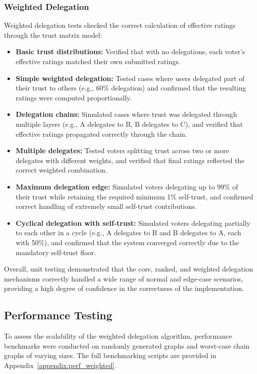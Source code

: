 \subsubsection{Weighted Delegation}
Weighted delegation tests checked the correct calculation of effective ratings through the trust matrix model:
\begin{itemize}
    \item \textbf{Basic trust distributions:} Verified that with no delegations, each voter's effective ratings matched their own submitted ratings.

    \item \textbf{Simple weighted delegation:} Tested cases where users delegated part of their trust to others (e.g., 60\% delegation) and confirmed that the resulting ratings were computed proportionally.

    \item \textbf{Delegation chains:} Simulated cases where trust was delegated through multiple layers (e.g., A delegates to B, B delegates to C), and verified that effective ratings propagated correctly through the chain.

    \item \textbf{Multiple delegates:} Tested voters splitting trust across two or more delegates with different weights, and verified that final ratings reflected the correct weighted combination.

    \item \textbf{Maximum delegation edge:} Simulated voters delegating up to 99\% of their trust while retaining the required minimum 1\% self-trust, and confirmed correct handling of extremely small self-trust contributions.

    \item \textbf{Cyclical delegation with self-trust:} Simulated voters delegating partially to each other in a cycle (e.g., A delegates to B and B delegates to A, each with 50\%), and confirmed that the system converged correctly due to the mandatory self-trust floor.
\end{itemize}

Overall, unit testing demonstrated that the core, ranked, and weighted delegation mechanisms correctly handled a wide range of normal and edge-case scenarios, providing a high degree of confidence in the correctness of the implementation.

\subsection{Performance Testing}
To assess the scalability of the weighted delegation algorithm, performance benchmarks were conducted on randomly generated graphs and worst-case chain graphs of varying sizes. The full benchmarking scripts are provided in Appendix~\ref{appendix:perf_weighted}.

